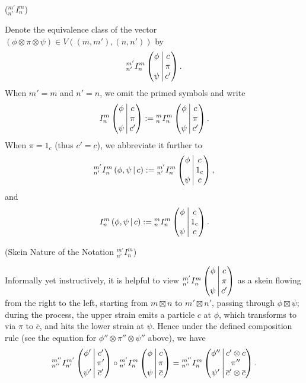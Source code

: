 \begin{notation} (${}^{m'}_{n'}I^{m}_{n}$)

  \noindent Denote the equivalence class of the vector
  $(\phi \otimes \pi \otimes \psi) \in V((m,m'),(n,n'))$ by
  \[\III{m'}{n'}{m}{n}{\phi}{\psi}{c}{\pi}{c'}.\]
  When $m' = m$ and $n' = n$, we omit the primed symbols and write
  \[
    \III{}{}{m}{n}{\phi}{\psi}{c}{\pi}{c'} :=
    \III{m}{n}{m}{n}{\phi}{\psi}{c}{\pi}{c'}.
  \]
  When $\pi = 1_{c}$ (thus $c' = c$), we abbreviate it further to
  \[
    \II{m'}{n'}{m}{n}{\phi}{\psi}{c} :=
    \III{m'}{n'}{m}{n}{\phi}{\psi}{c}{1_{c}}{c},
  \]
  and
  \[
    \II{}{}{m}{n}{\phi}{\psi}{c} :=
    \III{m}{n}{m}{n}{\phi}{\psi}{c}{1_{c}}{c}.
  \]
\end{notation}

\begin{remark}\label{remark/skein-nature-of-the-notation-I} (Skein Nature of the Notation ${}^{m'}_{n'}I^{m}_{n}$)

  \noindent Informally yet instructively, it is helpful to view
  $\III{m'}{n'}{m}{n}{\phi}{\psi}{c}{\pi}{c'}$ as a skein flowing from the right to
  the left, starting from $m \boxtimes n$ to $m' \boxtimes n'$, passing through $\phi \boxtimes \psi$;
  during the process, the upper strain emits a particle $c$ at $\phi$, which
  transforms to via $\pi$ to $\overline{c}$, and hits the lower strain at
  $\psi$. Hence under the defined composition rule (see the equation for
  $\phi'' \otimes \pi'' \otimes \psi''$ above), we have
  \[
    \III{m''}{n''}{m'}{n'}{\phi'}{\psi'}{c'}{\pi'}{\overline{c}'} \circ
    \III{m'}{n'}{m}{n}{\phi}{\psi}{c}{\pi}{\overline{c}} =
    \III{m''}{n''}{m}{n}{\phi''}{\psi'}{c' \otimes c}{\pi''}{\overline{c}' \otimes \overline{c}}.
  \]
\end{remark}


